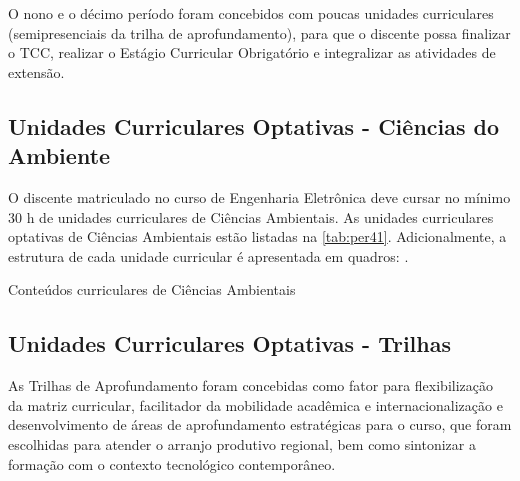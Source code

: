 \clearpage

O nono e o décimo período foram concebidos com poucas unidades curriculares (semipresenciais da trilha de aprofundamento), para que o discente possa finalizar o TCC, realizar o Estágio Curricular Obrigatório e integralizar as atividades de extensão.


\subsection{Unidades Curriculares Optativas - Ciências do Ambiente}
\label{subsec:ca}

O discente matriculado no curso de Engenharia Eletrônica deve cursar no mínimo 30 h de unidades curriculares de Ciências Ambientais. As unidades curriculares optativas de Ciências Ambientais estão listadas na \autoref{tab:per41}. Adicionalmente, a estrutura de cada unidade curricular é apresentada em quadros: . %

\begin{table}[!htb]
	\centering\footnotesize
	\caption{Conteúdos curriculares de Ciências Ambientais}
	\label{tab:per41}
\end{table}

\clearpage



\subsection{Unidades Curriculares Optativas - Trilhas}
\label{subsec:trilhas}

As Trilhas de Aprofundamento foram concebidas como fator para flexibilização da matriz curricular, facilitador da mobilidade acadêmica e internacionalização e desenvolvimento de áreas de aprofundamento estratégicas para o curso, que foram escolhidas para atender o arranjo produtivo regional, bem como sintonizar a formação com o contexto tecnológico contemporâneo.

